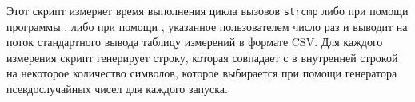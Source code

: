 Этот скрипт измеряет время выполнения цикла вызовов \texttt{strcmp} либо при помощи
программы , либо при помощи , указанное пользователем
число раз и выводит на поток стандартного вывода таблицу измерений в формате CSV.
Для каждого измерения скрипт генерирует строку, которая совпадает с в внутренней строкой 
 на некоторое количество символов, которое выбирается при помощи генератора
псевдослучайных чисел для каждого запуска.

\clearpage
